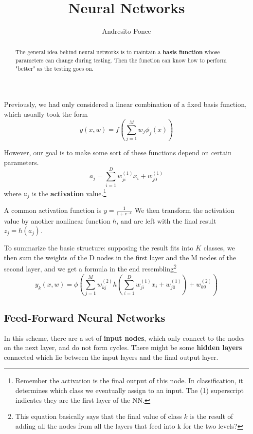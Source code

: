 \documentclass{tufte-handout}
\title{Neural Networks}
\author{Andresito Ponce}
\begin{document}
\maketitle

\begin{abstract}
	The general idea behind neural networks is to 
	maintain a \textbf{basis function} whose parameters
	can change during testing. Then the function can know 
	how to perform "better" as the testing goes on.
\end{abstract}

Previously, we had only considered a linear combination of a fixed
basis function, which usually took the form
\[ y(x, w) = f(\sum_{j=1}^{M}w_{j}\phi_{j}(x))\]

However, our goal is to make some sort of these functions depend on
certain parameters.
\[ a_{j} = \sum_{i=1}^{D}w^{(1)}_{ji}x_{i} + w^{(1)}_{j0}\]
where $a_{j}$ is the \textbf{activation} value.\footnote{Remember the
activation is the final output of this node. In classification, it 
determines which class we eventually assign to an input. The (1) 
superscript indicates they are the first layer of the NN.}

A common activation function is $y = \frac{1}{1+e^{-x}}$
We then transform the activation value by another nonlinear function
$h$, and are left with the final result $z_{j} = h(a_{j})$. 

To summarize the basic structure: supposing the result fits into 
$K$ classes, we then sum the weights of the D nodes in the first
layer and the M nodes of the second layer, and we get a formula 
in the end resembling\footnote{This equation basically says that
the final value of class $k$ is the result of adding all the nodes
from all the layers that feed into k for the two levels?}
\[ y_{k}(x, w) = \phi(\sum_{j=1}^{M}w_{kj}^{(2)}h(\sum_{i=1}^{D}
w_{ji}^{(1)}x_{i}+w_{j0}^{(1)})+w_{k0}^{(2)})\]

\subsection{Feed-Forward Neural Networks}
In this scheme, there are a set of \textbf{input nodes}, which only 
connect to the nodes on the next layer, and do not form cycles. 
There might be some \textbf{hidden layers} connected which lie between
the input layers and the final output layer. 
\end{document}
